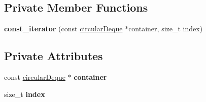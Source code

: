 \subsection*{Private Member Functions}
\begin{DoxyCompactItemize}
\item 
\hypertarget{classcircularDeque_1_1const__iterator_ac661ca71e0cc8321160e4364884fccda}{{\bfseries const\+\_\+iterator} (const \hyperlink{classcircularDeque}{circular\+Deque} $\ast$container, size\+\_\+t index)}\label{classcircularDeque_1_1const__iterator_ac661ca71e0cc8321160e4364884fccda}

\end{DoxyCompactItemize}
\subsection*{Private Attributes}
\begin{DoxyCompactItemize}
\item 
\hypertarget{classcircularDeque_1_1const__iterator_a60e5de271a30a0e308d405d719e24415}{const \hyperlink{classcircularDeque}{circular\+Deque} $\ast$ {\bfseries container}}\label{classcircularDeque_1_1const__iterator_a60e5de271a30a0e308d405d719e24415}

\item 
\hypertarget{classcircularDeque_1_1const__iterator_ad1106c610ff36cffdc47a9cd90db6260}{size\+\_\+t {\bfseries index}}\label{classcircularDeque_1_1const__iterator_ad1106c610ff36cffdc47a9cd90db6260}

\end{DoxyCompactItemize}
